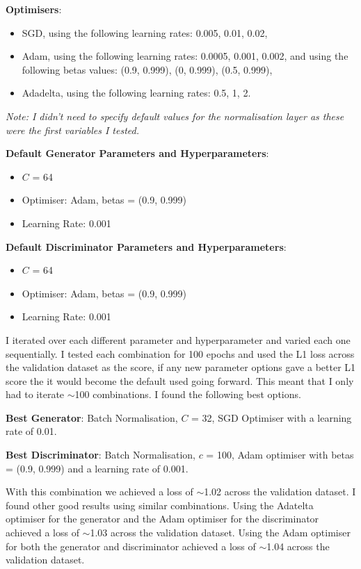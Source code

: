 \documentclass{UoYCSproject}
\begin{document}
\textbf{Optimisers}:
\begin{itemize}
\item SGD, using the following learning rates: 0.005, 0.01, 0.02,
\item Adam, using the following learning rates: 0.0005, 0.001, 0.002, and using the following betas values: (0.9, 0.999), (0, 0.999), (0.5, 0.999),
\item Adadelta, using the following learning rates: 0.5, 1, 2.
\end{itemize}

\emph{Note: I didn't need to specify default values for the normalisation layer as these were the first variables I tested.}

\textbf{Default Generator Parameters and Hyperparameters}: 
\begin{itemize}
\item $C$ = 64
\item Optimiser: Adam, betas = (0.9, 0.999)
\item Learning Rate: 0.001
\end{itemize}
\textbf{Default Discriminator Parameters and Hyperparameters}:
\begin{itemize}
\item $C$ = 64
\item Optimiser: Adam, betas = (0.9, 0.999)
\item Learning Rate: 0.001
\end{itemize}
I iterated over each different parameter and hyperparameter and varied each one sequentially. I tested each combination for 100 epochs and used the L1 loss across the validation dataset as the score, if any new parameter options gave a better L1 score the it would become the default used going forward. This meant that I only had to iterate \(\sim\)100 combinations. I found the following best options.

\textbf{Best Generator}: Batch Normalisation, $C$ = 32, SGD Optimiser with a learning rate of 0.01.

\textbf{Best Discriminator}: Batch Normalisation, $c$ = 100, Adam optimiser with betas = (0.9, 0.999) and a learning rate of 0.001.

With this combination we achieved a loss of \(\sim\)1.02 across the validation dataset. I found other good results using similar combinations. Using the Adatelta optimiser for the generator and the Adam optimiser for the discriminator achieved a loss of \(\sim\)1.03 across the validation dataset. Using the Adam optimiser for both the generator and discriminator achieved a loss of \(\sim\)1.04 across the validation dataset.
\end{document}
